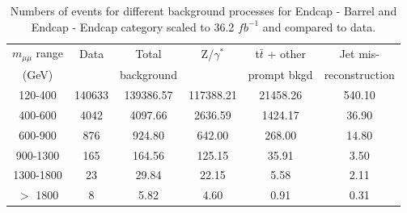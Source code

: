 \begin{table}[htb]
\begin{center}
\begin{tabular}{c|cc|ccc}
  $m_{\mu\mu}$ range & Data  & Total & Z/$\gamma^{*}$ & t$\bar{t}$ + other & Jet mis-\\
  (GeV) &      &   background   &      &  prompt bkgd    &   reconstruction\\ \hline
  120-400   &	140633	& 139386.57 &	117388.21	&	21458.26	&540.10\\
  400-600   &	4042	& 4097.66 &	2636.59	&	1424.17	&36.90\\ 
  600-900   &	876	& 924.80 &	642.00	&	268.00	&14.80\\
  900-1300   &	165	& 164.56 &	125.15	&	35.91	&3.50\\
  1300-1800   &	23	& 29.84 &	22.15	&	5.58& 2.11\\
  $>$ 1800   &	8	& 5.82&	4.60	&	0.91	&0.31\\
\end{tabular}
\caption{Numbers of events for different background processes for Endcap - Barrel and Endcap - Endcap category scaled to 36.2 $fb^{-1}$ and compared to data.}
\label{Yield_be}
\end{center}
\end{table}

